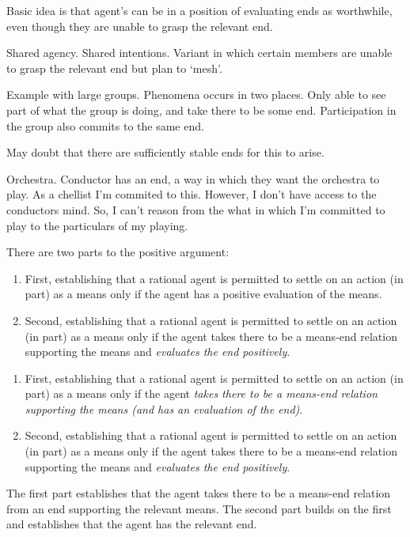 \documentclass[10pt]{article}
\begin{document}
Basic idea is that agent's can be in a position of evaluating ends as worthwhile, even though they are unable to grasp the relevant end.

Shared agency.
Shared intentions.
Variant in which certain members are unable to grasp the relevant end but plan to `mesh'.

Example with large groups.
Phenomena occurs in two places.
Only able to see part of what the group is doing, and take there to be some end.
Participation in the group also commits to the same end.

May doubt that there are sufficiently stable ends for this to arise.

Orchestra.
Conductor has an end, a way in which they want the orchestra to play.
As a chellist I'm commited to this.
However, I don't have access to the conductors mind.
So, I can't reason from the what in which I'm committed to play to the particulars of my playing.

\newpage

There are two parts to the positive argument:
\begin{enumerate}
\item First, establishing that a rational agent is permitted to settle on an action (in part) as a means only if the agent has a positive evaluation of the means.
\item Second, establishing that a rational agent is permitted to settle on an action (in part) as a means only if the agent takes there to be a means-end relation supporting the means and \emph{evaluates the end positively}.
\end{enumerate}

\begin{enumerate}[label=\arabic*., ref=(\arabic*)]
\item First, establishing that a rational agent is permitted to settle on an action (in part) as a means only if the agent \emph{takes there to be a means-end relation supporting the means (and has an evaluation of the end)}.
\item Second, establishing that a rational agent is permitted to settle on an action (in part) as a means only if the agent takes there to be a means-end relation supporting the means and \emph{evaluates the end positively}.
\end{enumerate}
The first part establishes that the agent takes there to be a means-end relation from an end supporting the relevant means.
The second part builds on the first and establishes that the agent has the relevant end.
\end{document}
